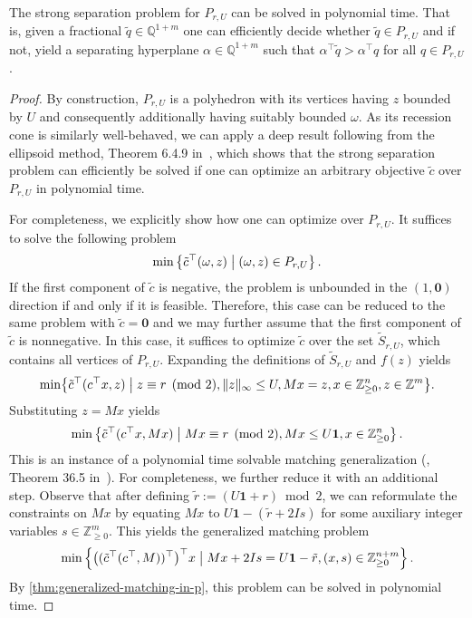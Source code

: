\documentclass[a4paper,UKenglish,cleveref,thm-restate]{lipics-v2021}
\newcommand{\Q}{\mathbb Q}
\newcommand{\Z}{\mathbb Z}
\newcommand{\veczero}{\mathbf0}
\newcommand{\vecone}{\mathbf1}
\begin{document}
\begin{lemma}
    The strong separation problem for $P_{r,U}$ can be solved in polynomial time. That is, given a fractional $\tilde q\in\Q^{1+m}$ one can efficiently decide whether $\tilde q\in P_{r,U}$ and if not, yield a separating hyperplane $\alpha\in\Q^{1+m}$ such that $\alpha^\top\tilde q>\alpha^\top q$ for all $q\in P_{r,U}$.
    \label{lemma:separation-oracle}
\end{lemma}

\begin{proof}
    By construction, $P_{r,U}$ is a polyhedron with its vertices having $z$ bounded by $U$ and consequently additionally having suitably bounded $\omega$. As its recession cone is similarly well-behaved, we can apply a deep result following from the ellipsoid method, Theorem 6.4.9 in~\cite{DBLP:books/sp/GLS1988}, which shows that the strong separation problem can efficiently be solved if one can optimize an arbitrary objective $\tilde c$ over $P_{r,U}$ in polynomial time.

    For completeness, we explicitly show how one can optimize over $P_{r,U}$. It suffices to solve the following problem
    \[
        \min\left\{\tilde c^\top(\omega,z)\bigm\vert(\omega,z)\in P_{r,U}\right\}.
    \]
    If the first component of $\tilde c$ is negative, the problem is unbounded in the $(1,\veczero)$ direction if and only if it is feasible. Therefore, this case can be reduced to the same problem with $\tilde c=\veczero$ and we may further assume that the first component of $\tilde c$ is nonnegative. In this case, it suffices to optimize $\tilde c$ over the set $\tilde S_{r,U}$, which contains all vertices of $P_{r,U}$. Expanding the definitions of $\tilde S_{r,U}$ and $f(z)$ yields
    \[
        \min\bigl\{\tilde c^\top(c^\top x,z)\bigm\vert z\equiv r\pmod2,\|z\|_\infty\le U,Mx=z,x\in\Z_{\ge0}^n,z\in\Z^m\bigr\}.
    \]
    Substituting $z=Mx$ yields
    \[
        \min\left\{\tilde c^\top(c^\top x,Mx)\bigm\vert Mx\equiv r\pmod2,Mx\le U\vecone,x\in\Z_{\ge0}^n\right\}.
    \]
    This is an instance of a polynomial time solvable matching generalization (\cite{DBLP:journals/mp/EdmondsJ73}, Theorem 36.5 in~\cite{schrijver2003combinatorial}). For completeness, we further reduce it with an additional step. Observe that after defining $\tilde r:=(U\vecone+r)\bmod2$, we can reformulate the constraints on $Mx$ by equating $Mx$ to $U\vecone-(\tilde r+2Is)$ for some auxiliary integer variables $s\in\Z_{\ge0}^m$. This yields the generalized matching problem
    \[
        \min\left\{\bigl((\tilde c^\top(c^\top,M))^\top\bigr)^\top x\bigm\vert Mx+2Is=U\vecone-\tilde r,(x,s)\in\Z_{\ge0}^{n+m}\right\}.
    \]
    By \cref{thm:generalized-matching-in-p}, this problem can be solved in polynomial time.
\end{proof}
\end{document}
